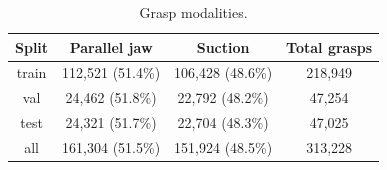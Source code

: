 \begin{table}[htbp]
  \centering
  \caption{Grasp modalities.}
  \label{tab:stage1_grasp_type_counts}
  \small
  \setlength{\tabcolsep}{4.5pt}
  \begin{tabular}{cccc}
    \toprule
    Split & Parallel jaw & Suction & Total grasps \\
    \midrule
    train & 112,521 (51.4\%) & 106,428 (48.6\%) & 218,949 \\
    val & 24,462 (51.8\%) & 22,792 (48.2\%) & 47,254 \\
    test & 24,321 (51.7\%) & 22,704 (48.3\%) & 47,025 \\
    all & 161,304 (51.5\%) & 151,924 (48.5\%) & 313,228 \\
    \bottomrule
  \end{tabular}
\end{table}
